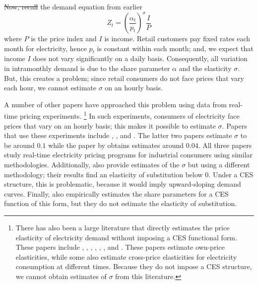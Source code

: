 \documentclass[11pt,a4paper,leqno]{extarticle}
\providecommand{\DIFadd}[1]{{\protect\color{blue}\uwave{#1}}} %
\providecommand{\DIFdel}[1]{{\protect\color{red}\sout{#1}}}                      %
\providecommand{\DIFaddbegin}{} %
\providecommand{\DIFaddend}{} %
\providecommand{\DIFdelbegin}{} %
\providecommand{\DIFdelend}{} %
\begin{document}
	\DIFdelbegin \DIFdel{Now, recall }\DIFdelend \DIFaddbegin \DIFadd{Recall }\DIFaddend the demand equation from earlier
	\begin{equation}
	Z_t = \left(\frac{\alpha_t}{p_t} \right)^\sigma \frac{I}{P}
	\end{equation}
	where $P$ is the price index and $I$ is income. Retail customers pay fixed rates each month for electricity, hence $p_t$ is constant within each month; and, we expect that income $I$ does not vary significantly on a daily basis. Consequently, all variation in intramonthly demand is due to the share parameter \DIFdelbegin \DIFdel{$\alpha$ }\DIFdelend \DIFaddbegin \DIFadd{$\boldsymbol{\alpha}$ }\DIFaddend and the elasticity $\sigma$. But, this creates a problem; since retail consumers do not face prices that vary each hour, we cannot estimate  $\sigma$ on an hourly basis. 
	
	A number of other papers have approached this problem using data from real-time pricing experiments.
	\footnote{ There has also been a large literature that directly estimates the price elasticity of electricity demand without imposing a CES functional form. These papers include \citet{Wolak}, \citet{Zarnikau}, \citet{Woo}, \citet{Zhou}, \citet{Reiss}, \citet{Fan}, and \citet{Deryugina}. These papers estimate own-price elasticities, while some also estimate cross-price elasticities for electricity consumption at different times. Because they do not impose a CES structure, we cannot obtain estimates of $\sigma$ from this literature. } In such experiments, consumers of electricity face prices that vary on an hourly basis; this makes it possible to estimate $\sigma$. Papers that use these experiments include \citet{Schwarz}, \citet{Herriges}, and \citet{KS1994}.
	The latter two papers estimate $\sigma$ to be around \DIFdelbegin \DIFdel{$0.1$ }\DIFdelend \DIFaddbegin \DIFadd{$0.15$ }\DIFaddend while the paper by \citeauthor{Schwarz}  obtains estimates around \DIFdelbegin \DIFdel{$0.04$}\DIFdelend \DIFaddbegin \DIFadd{$0.03$}\DIFaddend . All three papers study real-time electricity pricing programs for industrial consumers using similar methodologies. Additionally, \citet{Aubin} also provide estimates of the $\sigma$ but using a different methodology; their results find an elasticity of substitution below 0. Under a CES structure, this is problematic, because it would imply upward-sloping demand curves. Finally, \citet{Moha2016} also empirically estimates the share parameters for a CES function of this form, but they do not estimate the elasticity of substitution. 
	
\end{document}
